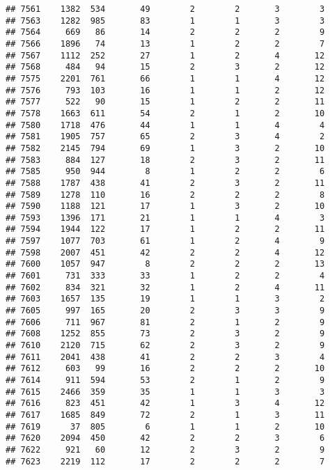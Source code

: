 \documentclass[]{article}
\begin{document}
\begin{verbatim}
## 7561    1382  534       49        2        2       3        3
## 7563    1282  985       83        1        1       3        3
## 7564     669   86       14        2        2       2        9
## 7566    1896   74       13        1        2       2        7
## 7567    1112  252       27        1        2       4       12
## 7568     484   94       15        2        3       2       12
## 7575    2201  761       66        1        1       4       12
## 7576     793  103       16        1        1       2       12
## 7577     522   90       15        1        2       2       11
## 7578    1663  611       54        2        1       2       10
## 7580    1718  476       44        1        1       4        4
## 7581    1905  757       65        2        3       4        2
## 7582    2145  794       69        1        3       2       10
## 7583     884  127       18        2        3       2       11
## 7585     950  944        8        1        2       2        6
## 7588    1787  438       41        2        3       2       11
## 7589    1278  110       16        2        2       2        8
## 7590    1188  121       17        1        3       2       10
## 7593    1396  171       21        1        1       4        3
## 7594    1944  122       17        1        2       2       11
## 7597    1077  703       61        1        2       4        9
## 7598    2007  451       42        2        2       4       12
## 7600    1057  947        8        2        2       2       13
## 7601     731  333       33        1        2       2        4
## 7602     834  321       32        1        2       4       11
## 7603    1657  135       19        1        1       3        2
## 7605     997  165       20        2        3       3        9
## 7606     711  967       81        2        1       2        9
## 7608    1252  855       73        2        3       2        9
## 7610    2120  715       62        2        3       2        9
## 7611    2041  438       41        2        2       3        4
## 7612     603   99       16        2        2       2       10
## 7614     911  594       53        2        1       2        9
## 7615    2466  359       35        1        1       3        3
## 7616     823  451       42        1        3       4       12
## 7617    1685  849       72        2        1       3       11
## 7619      37  805        6        1        1       2       10
## 7620    2094  450       42        2        2       3        6
## 7622     921   60       12        2        3       2        9
## 7623    2219  112       17        2        2       2        7

\end{verbatim}
\end{document}
